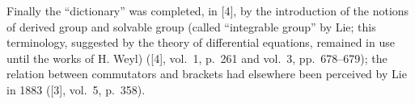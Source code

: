 Finally the ``dictionary'' was completed, in {[}4{]}, by the introduction of the notions of derived group and solvable group (called ``integrable group'' by Lie; this terminology, suggested by the theory of differential equations, remained in use until the works of H. Weyl) ({[}4{]}, vol.~1, p.~261 and vol.~3, pp.~678--679); the relation between commutators and brackets had elsewhere been perceived by Lie in 1883 ({[}3{]}, vol.~5, p.~358).

